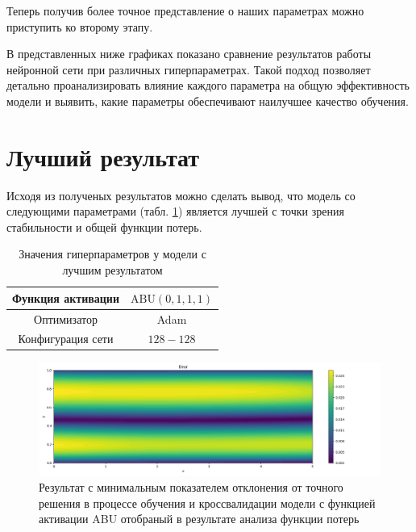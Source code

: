 Теперь получив более точное представление о наших параметрах можно приступить
ко второму этапу.

В представленных ниже графиках показано сравнение результатов работы нейронной сети
при различных гиперпараметрах. Такой подход позволяет детально проанализировать
влияние каждого параметра на общую эффективность модели и выявить, какие параметры
обеспечивают наилучшее качество обучения.




\section{Лучший результат}
Исходя из полученых результатов можно сделать вывод, что модель со следующими
параметрами (табл. \ref{table:couette_abu_best_params}) является лучшей с точки
зрения стабильности и общей функции потерь.

\begin{table}[ht]
    \centering
    \caption{Значения гиперпараметров у модели с лучшим результатом}
    \begin{tabular}{ |c|c| } 
        \hline
        Функция активации & $\text{ABU}(0, 1, 1, 1)$ \\
        \hline
        Оптимизатор & Adam \\ 
        \hline
        Конфигурация сети & $128-128$ \\ 
        \hline
    \end{tabular}
    \label{table:couette_abu_best_params}
\end{table}

\begin{figure}[ht]
    \includegraphics{data/couette_abu_error_best.png}
    \caption{Результат с минимальным показателем отклонения от точного решения в процессе обучения и
    кроссвалидации модели с функцией активации ABU отобраный в результате анализа функции потерь}
    \label{fig:couette_abu_best}
\end{figure}

